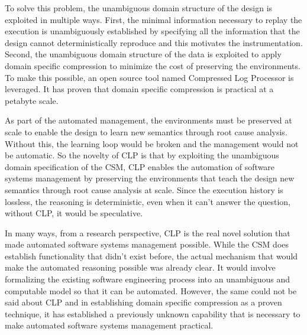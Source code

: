 To solve this problem, the unambiguous domain structure of the design is exploited in multiple ways. First, the minimal information necessary to replay the execution is unambiguously established by specifying all the information that the design cannot deterministically reproduce and this motivates the instrumentation. Second, the unambiguous domain structure of the data is exploited to apply domain specific compression to minimize the cost of preserving the environments. To make this possible, an open source tool named Compressed Log Processor is leveraged. It has proven that domain specific compression is practical at a petabyte scale.

As part of the automated management, the environments must be preserved at scale to enable the design to learn new semantics through root cause analysis. Without this, the learning loop would be broken and the management would not be automatic. So the novelty of CLP is that by exploiting the unambiguous domain specification of the CSM, CLP enables the automation of software systems management by preserving the environments that teach the design new semantics through root cause analysis at scale. Since the execution history is lossless, the reasoning is deterministic, even when it can't answer the question, without CLP, it would be speculative.

In many ways, from a research perspective, CLP is the real novel solution that made automated software systems management possible. While the CSM does establish functionality that didn't exist before, the actual mechanism that would make the automated reasoning possible was already clear. It would involve formalizing the existing software engineering process into an unambiguous and computable model so that it can be automated. However, the same could not be said about CLP and in establishing domain specific compression as a proven technique, it has established a previously unknown capability that is necessary to make automated software systems management practical. 